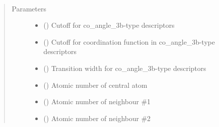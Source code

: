 \documentclass[letterpaper,10pt,english]{sphinxmanual}
\begin{document}

\begin{fulllineitems}
\label{\detokenize{descriptors:gap.descriptors.co_angle_3b}}~\begin{quote}\begin{description}
\item[{Parameters}] \leavevmode\begin{itemize}
\item {} 
 () \textendash{} Cutoff for co\_angle\_3b-type descriptors

\item {} 
 () \textendash{} Cutoff for coordination function in co\_angle\_3b-type descriptors

\item {} 
 () \textendash{} Transition width for co\_angle\_3b-type descriptors

\item {} 
 () \textendash{} Atomic number of central atom

\item {} 
 () \textendash{} Atomic number of neighbour \#1

\item {} 
 () \textendash{} Atomic number of neighbour \#2

\end{itemize}

\end{description}\end{quote}

\end{fulllineitems}
\end{document}
